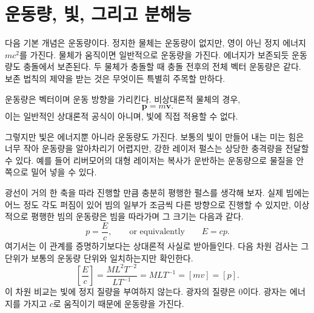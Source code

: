 \begin{classroomqa}
\end{classroomqa}

\begin{classroomqa}
\end{classroomqa}

\section{운동량, 빛, 그리고 분해능}

다음 기본 개념은 운동량이다. 정지한 물체는 운동량이 없지만, 영이 아닌 정지 에너지 \(mc^2\)를 가진다. 물체가 움직이면 일반적으로 운동량을 가진다. 에너지가 보존되듯 운동량도 충돌에서 보존된다. 두 물체가 충돌할 때 충돌 전후의 전체 벡터 운동량은 같다. 보존 법칙의 제약을 받는 것은 무엇이든 특별히 주목할 만하다.

운동량은 벡터이며 운동 방향을 가리킨다. 비상대론적 물체의 경우,
\begin{equation}
\mathbf p=m\mathbf v.
\end{equation}
이는 일반적인 상대론적 공식이 아니며, 빛에 직접 적용할 수 없다.

그렇지만 빛은 에너지뿐 아니라 운동량도 가진다. 보통의 빛이 만들어 내는 미는 힘은 너무 작아 운동량을 알아차리기 어렵지만, 강한 레이저 펄스는 상당한 충격량을 전달할 수 있다. 예를 들어 리버모어의 대형 레이저는 복사가 운반하는 운동량으로 물질을 안쪽으로 밀어 넣을 수 있다.

광선이 거의 한 축을 따라 진행할 만큼 충분히 평행한 펄스를 생각해 보자. 실제 빔에는 어느 정도 각도 퍼짐이 있어 빔의 일부가 조금씩 다른 방향으로 진행할 수 있지만, 이상적으로 평행한 빔의 운동량은 빔을 따라가며 그 크기는 다음과 같다.
\begin{equation}
p=\frac{E}{c},
\qquad\text{or equivalently}\qquad
E=cp.
\end{equation}
여기서는 이 관계를 증명하기보다는 상대론적 사실로 받아들인다. 다음 차원 검사는 그 단위가 보통의 운동량 단위와 일치하는지만 확인한다.
\begin{equation}
\left[\frac{E}{c}\right]
=
\frac{M L^2 T^{-2}}{L T^{-1}}
=
M L T^{-1}
=
[m v]
=
[p].
\end{equation}
이 차원 비교는 빛에 정지 질량을 부여하지 않는다. 광자의 질량은 0이다. 광자는 에너지를 가지고 \(c\)로 움직이기 때문에 운동량을 가진다.

